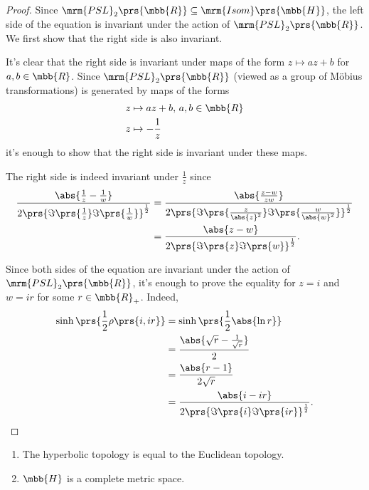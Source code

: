 \documentclass[10pt, twoside]{book}
\begin{document}
\begin{proof}
Since $\mrm{PSL}_2\prs{\mbb{R}} \subseteq \mrm{Isom}\prs{\mbb{H}}$, the left side of the equation is invariant under the action of $\mrm{PSL}_2\prs{\mbb{R}}$. We first show that the right side is also invariant.

It's clear that the right side is invariant under maps of the form $z \mapsto az + b$ for $a,b \in \mbb{R}$. Since $\mrm{PSL}_2\prs{\mbb{R}}$ (viewed as a group of Möbius transformations) is generated by maps of the forms
\begin{align*}
z &\mapsto az + b, \, a,b\in\mbb{R} \\
z &\mapsto - \frac{1}{z}
\end{align*}
it's enough to show that the right side is invariant under these maps.

The right side is indeed invariant under $\frac{1}{z}$ since
\begin{align*}
\frac{\abs{\frac{1}{z} - \frac{1}{w}}}{2 \prs{\Im\prs{\frac{1}{z}} \Im\prs{\frac{1}{w}}}^{\frac{1}{2}}}
&=
\frac{\abs{\frac{z-w}{zw}}}{2 \prs{\Im\prs{\frac{z}{\abs{z}^2}} \Im\prs{\frac{w}{\abs{w}^2}}}^{\frac{1}{2}}}
\\&=
\frac{\abs{z-w}}{2 \prs{\Im\prs{z}\Im\prs{w}}^{\frac{1}{2}}} \text{.}
\end{align*}

Since both sides of the equation are invariant under the action of $\mrm{PSL}_2\prs{\mbb{R}}$, it's enough to prove the equality for $z=i$ and $w = ir$ for some $r \in \mbb{R}_+$.
Indeed,
\begin{align*}
\sinh\prs{\frac{1}{2} \rho\prs{i, ir}} &=
\sinh\prs{\frac{1}{2} \abs{\ln r}}
\\&=
\frac{\abs{\sqrt{r} - \frac{1}{\sqrt{r}}}}{2}
\\&=
\frac{\abs{r-1}}{2 \sqrt{r}}
\\&=
\frac{\abs{i - ir}}{2 \prs{\Im\prs{i} \Im\prs{ir}}^{\frac{1}{2}}} \text{.}
\end{align*}
\end{proof}

\begin{corollary}
\begin{enumerate}
\item The hyperbolic topology is equal to the Euclidean topology.
\item $\mbb{H}$ is a complete metric space.
\end{enumerate}
\end{corollary}
\end{document}
